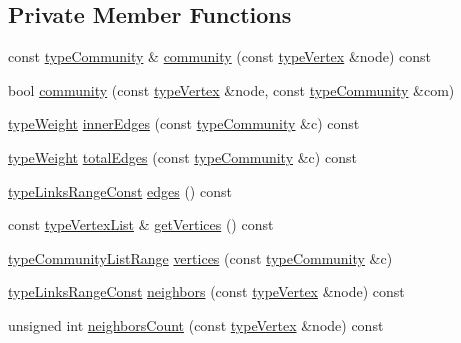 \subsection*{Private Member Functions}
\begin{DoxyCompactItemize}
\item 
const \hyperlink{graphUndirectedGroupable_8h_a914da95c9ea7f14f4b7f875c36818556}{type\+Community} \& \hyperlink{classLouvain_ae2fa8ae9be32c0ef6b3ed28f68364972}{community} (const \hyperlink{edge_8h_a5fbd20c46956d479cb10afc9855223f6}{type\+Vertex} \&node) const
\item 
bool \hyperlink{classLouvain_a0b978ea547fbbeb7bf6b023694c57233}{community} (const \hyperlink{edge_8h_a5fbd20c46956d479cb10afc9855223f6}{type\+Vertex} \&node, const \hyperlink{graphUndirectedGroupable_8h_a914da95c9ea7f14f4b7f875c36818556}{type\+Community} \&com)
\item 
\hyperlink{edge_8h_a2e7ea3be891ac8b52f749ec73fee6dd2}{type\+Weight} \hyperlink{classLouvain_a18888635fdb482b3754730b6c2e0d6cb}{inner\+Edges} (const \hyperlink{graphUndirectedGroupable_8h_a914da95c9ea7f14f4b7f875c36818556}{type\+Community} \&c) const
\item 
\hyperlink{edge_8h_a2e7ea3be891ac8b52f749ec73fee6dd2}{type\+Weight} \hyperlink{classLouvain_a5f8dc310d5f177b29804298966ac742d}{total\+Edges} (const \hyperlink{graphUndirectedGroupable_8h_a914da95c9ea7f14f4b7f875c36818556}{type\+Community} \&c) const
\item 
\hyperlink{graphInterface_8h_ae8d27008f15586bbf419af7ad2e0a48a}{type\+Links\+Range\+Const} \hyperlink{classLouvain_a127146c7b0a173c50291cf0675b2e75d}{edges} () const
\item 
const \hyperlink{graphInterface_8h_a21d54d8a139def524d3b0d6f71ec4974}{type\+Vertex\+List} \& \hyperlink{classLouvain_a6925703de3b3ead5b37af4b8a2ceb9b4}{get\+Vertices} () const
\item 
\hyperlink{graphUndirectedGroupable_8h_ad440de7f8b59665f0705cc6f745aab09}{type\+Community\+List\+Range} \hyperlink{classLouvain_aa342e14bd6eb07d05786f7069825a0c3}{vertices} (const \hyperlink{graphUndirectedGroupable_8h_a914da95c9ea7f14f4b7f875c36818556}{type\+Community} \&c)
\item 
\hyperlink{graphInterface_8h_ae8d27008f15586bbf419af7ad2e0a48a}{type\+Links\+Range\+Const} \hyperlink{classLouvain_a68749bff6ff4894606b660cc827f9d79}{neighbors} (const \hyperlink{edge_8h_a5fbd20c46956d479cb10afc9855223f6}{type\+Vertex} \&node) const
\item 
unsigned int \hyperlink{classLouvain_a6908d96331a9294d01d88ea97a405508}{neighbors\+Count} (const \hyperlink{edge_8h_a5fbd20c46956d479cb10afc9855223f6}{type\+Vertex} \&node) const

\end{DoxyCompactItemize}
